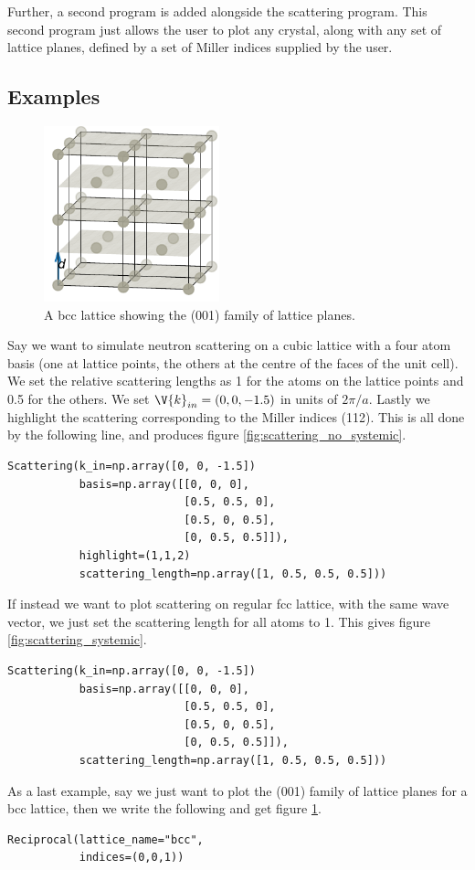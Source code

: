\documentclass[main.tex]{subfiles}
\begin{document}
	 
	Further, a second program is added alongside the scattering program. This second program just allows the user to plot any crystal, along with any set of lattice planes, defined by a set of Miller indices supplied by the user.
	
	\subsection{Examples}
	\begin{figure}
		\includegraphics[width=2in]{figures/lattice_planes_1.pdf}
		\caption{A bcc lattice showing the (001) family of lattice planes.}
		\label{fig:lattice_planes}
	\end{figure}
	Say we want to simulate neutron scattering on a cubic lattice with a four atom basis (one at lattice points, the others at the centre of the faces of the unit cell). We set the relative scattering lengths as 1 for the atoms on the lattice points and 0.5 for the others. We set $ \V{k}_{in} = (0, 0, -1.5)$ in units of $ 2\pi/a $. Lastly we highlight the scattering corresponding to the Miller indices (112). This is all done by the following line, and produces figure \ref{fig:scattering_no_systemic}.
\begin{lstlisting}
Scattering(k_in=np.array([0, 0, -1.5])
		   basis=np.array([[0, 0, 0], 
						   [0.5, 0.5, 0],
						   [0.5, 0, 0.5],
						   [0, 0.5, 0.5]]),	
		   highlight=(1,1,2)
		   scattering_length=np.array([1, 0.5, 0.5, 0.5]))
\end{lstlisting}

	If instead we want to plot scattering on regular fcc lattice, with the same wave vector, we just set the scattering length for all atoms to 1. This gives figure \ref{fig:scattering_systemic}.
\begin{lstlisting}
Scattering(k_in=np.array([0, 0, -1.5])
		   basis=np.array([[0, 0, 0], 
						   [0.5, 0.5, 0],
						   [0.5, 0, 0.5],
						   [0, 0.5, 0.5]]),	
		   scattering_length=np.array([1, 0.5, 0.5, 0.5]))
\end{lstlisting}
	As a last example, say we just want to plot the (001) family of lattice planes for a bcc lattice, then we write the following and get figure \ref{fig:lattice_planes}.
\begin{lstlisting}
Reciprocal(lattice_name="bcc",
		   indices=(0,0,1))
\end{lstlisting}
	
\end{document}
